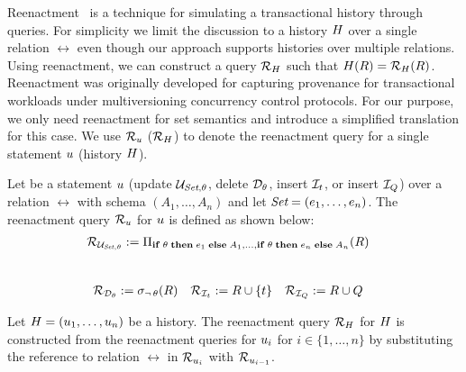 Reenactment~\cite{AG18,AG14} is a technique
for simulating a transactional history through queries. For simplicity we limit the discussion to a history $H$ over a single relation $\rel$ even though our approach supports histories over multiple relations. Using reenactment, we
can construct a query $\mathcal{R}_{H}$ such that
$H(R) = \mathcal{R}_{H}(R)$. Reenactment
was originally developed for capturing provenance for transactional workloads
under multiversioning concurrency control protocols. For our purpose, we only
need reenactment for set semantics and introduce a simplified translation for this case.
We use $\mathcal{R}_{u}$ ($\mathcal{R}_{H}$) to denote the reenactment query for a single statement $u$ (history $H$).

\begin{defi}\label{def:reenactment-queries}
  Let be a statement $u$ (update $\mathcal{U}_{\textit{Set},\theta}$, delete $\mathcal{D}_{\theta}$, insert $\mathcal{I}_{t}$, or insert $\mathcal{I}_{Q}$) over a relation $\rel$ with schema $(A_1, \ldots, A_n)$ and let $\textit{Set} = (e_1, \ldots, e_n)$. The reenactment query  $\mathcal{R}_{u}$ for $u$ is defined as shown below:
%
  \begin{align*}
    \mathcal{R}_{\mathcal{U}_{\textit{Set},\theta}} & := \Pi_{\mathbf{if}\thickspace \theta \thickspace \mathbf{then} \thickspace e_1 \thickspace \mathbf{else} \thickspace A_1, \ldots, \mathbf{if}\thickspace \theta \thickspace \mathbf{then} \thickspace e_n \thickspace \mathbf{else} \thickspace A_n}(R)
  \end{align*}\\[-9mm]
  \begin{align*}
        \mathcal{R}_{\mathcal{D}_{\theta}} & := \sigma_{\neg\, \theta}(R) &
    \mathcal{R}_{\mathcal{I}_{t}} & := R \cup \{ t \} &
    \mathcal{R}_{\mathcal{I}_{Q}} & := R \cup Q
  \end{align*}

%
Let $H = (u_1, \ldots, u_n)$ be a history. The reenactment query $\mathcal{R}_{H}$ for $H$ is constructed from the reenactment queries for $u_i$ for $i \in \{1,\ldots,n\}$ by substituting the reference to relation $\rel$ in $\mathcal{R}_{u_i}$ with $\mathcal{R}_{u_{i-1}}$.
\end{defi}

